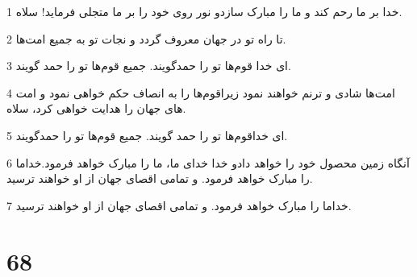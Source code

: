 \par 1 خدا بر ما رحم کند و ما را مبارک سازدو نور روی خود را بر ما متجلی فرماید! سلاه.
\par 2 تا راه تو در جهان معروف گردد و نجات تو به جمیع امت‌ها.
\par 3 ‌ای خدا قوم‌ها تو را حمدگویند. جمیع قوم‌ها تو را حمد گویند.
\par 4 امت‌ها شادی و ترنم خواهند نمود زیراقوم‌ها را به انصاف حکم خواهی نمود و امت های جهان را هدایت خواهی کرد، سلاه.
\par 5 ‌ای خداقوم‌ها تو را حمد گویند. جمیع قوم‌ها تو را حمدگویند.
\par 6 آنگاه زمین محصول خود را خواهد دادو خدا خدای ما، ما را مبارک خواهد فرمود.خداما را مبارک خواهد فرمود. و تمامی اقصای جهان از او خواهند ترسید.
\par 7 خداما را مبارک خواهد فرمود. و تمامی اقصای جهان از او خواهند ترسید.
 
\chapter{68}

